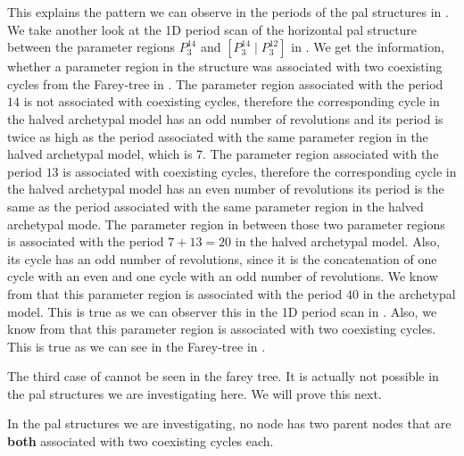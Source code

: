 This explains the pattern we can observe in the periods of the \gls{pal} structures in .
We take another look at the 1D period scan of the horizontal \gls{pal} structure between the parameter regions $P^{14}_3$ and $\left[P^{14}_3  \mid P^{12}_3\right]$ in .
We get the information, whether a parameter region in the structure was associated with two coexisting cycles from the Farey-tree in .
The parameter region associated with the period $14$ is not associated with coexisting cycles, therefore the corresponding cycle in the halved archetypal model has an odd number of revolutions and its period is twice as high as the period associated with the same parameter region in the halved archetypal model, which is $7$.
The parameter region associated with the period $13$ is associated with coexisting cycles, therefore the corresponding cycle in the halved archetypal model has an even number of revolutions its period is the same as the period associated with the same parameter region in the halved archetypal mode.
The parameter region in between those two parameter regions is associated with the period $7 + 13 = 20$ in the halved archetypal model.
Also, its cycle has an odd number of revolutions, since it is the concatenation of one cycle with an even and one cycle with an odd number of revolutions.
We know from  that this parameter region is associated with the period $40$ in the archetypal model.
This is true as we can observer this in the 1D period scan in .
Also, we know from  that this parameter region is associated with two coexisting cycles.
This is true as we can see in the Farey-tree in .

The third case of  cannot be seen in the farey tree.
It is actually not possible in the \gls{pal} structures we are investigating here.
We will prove this next.

\begin{theorem}
	\label{theorem:no.parent.coex}
	In the \gls{pal} structures we are investigating, no node has two parent nodes that are \textbf{both} associated with two coexisting cycles each.
\end{theorem}

